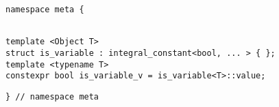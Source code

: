 
\begin{verbatim}
namespace meta {
\end{verbatim}
\begin{verbatim}

template <Object T>
struct is_variable : integral_constant<bool, ... > { };
template <typename T>
constexpr bool is_variable_v = is_variable<T>::value;

\end{verbatim}
\begin{verbatim}
} // namespace meta
\end{verbatim}
